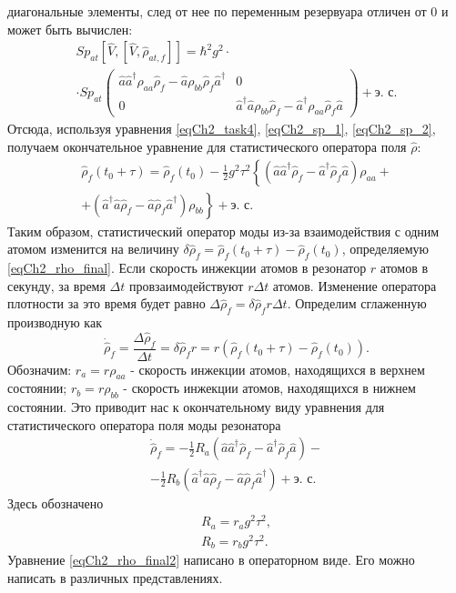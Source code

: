диагональные элементы, след от нее по переменным резервуара отличен от 
0  и может быть вычислен: 
\begin{eqnarray}
Sp_{at}\left[\hat{V},\left[\hat{V}, \hat{\rho}_{at, f}\right] \right]
= \hbar^2 g^2 \cdot
\nonumber \\
\cdot Sp_{at}
\left(
\begin{array} {cc}
\hat{a} \hat{a}^{\dag}\rho_{aa} \hat{\rho}_{f} -
\hat{a}\rho_{bb} \hat{\rho}_{f}\hat{a}^{\dag}  & 0
\\
0 & 
\hat{a}^{\dag} \hat{a}\rho_{bb} \hat{\rho}_{f} -
\hat{a}^{\dag}\rho_{aa} \hat{\rho}_{f}\hat{a} 
\end{array}
\right) + \mbox{э. с.} 
\label{eqCh2_sp_2}
\end{eqnarray}
Отсюда, используя уравнения \eqref{eqCh2_task4},
\eqref{eqCh2_sp_1}, \eqref{eqCh2_sp_2}, получаем окончательное
уравнение для статистического оператора поля  $\hat{\rho}$:  
\begin{eqnarray}
\hat{\rho}_{f}\left(t_0 + \tau\right) =
\hat{\rho}_{f}\left(t_0\right) - \frac{1}{2}g^2 \tau^2
\left\{
\left(\hat{a}\hat{a}^{\dag}\hat{\rho}_{f} - 
\hat{a}^{\dag}\hat{\rho}_{f}\hat{a}
\right)\rho_{aa} +
\right.
\nonumber \\
\left.
+
\left(\hat{a}^{\dag}\hat{a}\hat{\rho}_{f} - 
\hat{a}\hat{\rho}_{f}\hat{a}^{\dag}
\right)\rho_{bb}
\right\} + \mbox{э. с.}
\label{eqCh2_rho_final}
\end{eqnarray}
Таким образом, статистический оператор моды из-за взаимодействия с
одним атомом изменится на величину 
\(
\delta\hat{\rho}_{f}=
\hat{\rho}_{f}\left(t_0 + \tau\right) -
\hat{\rho}_{f}\left(t_0\right)
\), определяемую \eqref{eqCh2_rho_final}. Если скорость инжекции
атомов в резонатор $r$  атомов в секунду, за время  $\Delta t$
провзаимодействуют  $r \Delta t$  атомов. Изменение оператора
плотности за это  время будет равно 
$\Delta \hat{\rho}_{f} = \delta\hat{\rho}_{f}r \Delta t$. Определим сглаженную
производную как 
\[
\dot{\hat{\rho}}_{f} = \frac{\Delta \hat{\rho}_{f}}{\Delta t} = 
\delta\hat{\rho}_{f} r = r 
\left(
\hat{\rho}_{f}\left(t_0 + \tau\right) -
\hat{\rho}_{f}\left(t_0\right)
\right).
\]
Обозначим: $r_a = r \rho_{aa}$ - скорость инжекции атомов, находящихся
в верхнем состоянии; $r_b = r \rho_{bb}$ - скорость инжекции атомов,
находящихся в нижнем состоянии. Это приводит нас к окончательному виду
уравнения для статистического оператора поля моды резонатора 
\begin{eqnarray}
\dot{\hat{\rho}}_{f} =
- \frac{1}{2}R_a
\left(\hat{a}\hat{a}^{\dag}\hat{\rho}_{f} - 
\hat{a}^{\dag}\hat{\rho}_{f}\hat{a}
\right)
- 
\nonumber \\
- \frac{1}{2}R_b
\left(\hat{a}^{\dag}\hat{a}\hat{\rho}_{f} - 
\hat{a}\hat{\rho}_{f}\hat{a}^{\dag}
\right)
 + \mbox{э. с.}
\label{eqCh2_rho_final2}
\end{eqnarray}
Здесь обозначено 
\begin{eqnarray}
R_a=r_a g^2\tau^2,
\nonumber \\
R_b=r_b g^2\tau^2.
\label{eqCh2_RaRbDefenition}
\end{eqnarray}
Уравнение
\eqref{eqCh2_rho_final2} написано в операторном виде. Его можно
написать в различных представлениях.   
